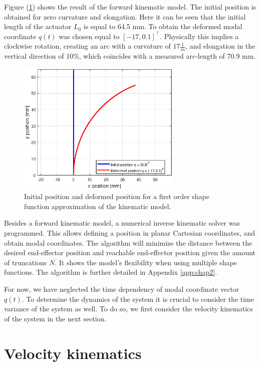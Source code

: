 Figure (\ref{fig1:forward_kinematic}) shows the result of the forward kinematic model. The initial position is obtained for zero curvature and elongation. Here it can be seen that the initial length of the actuator $L_0$ is equal to 64.5 mm. To obtain the deformed modal coordinate $q(t)$ was chosen equal to $[-17,0.1]^\top$. Physically this implies a clockwise rotation, creating an arc with a curvature of $17 \frac{1}{m}$, and elongation in the vertical direction of 10\%, which coincides with a measured arc-length of 70.9 mm.


\begin{figure}[H]
    \centering
    \includegraphics[width = 0.7\textwidth]{Figures/Chapter2/fkin1701.eps}
    \caption{Initial position and deformed position for a first order shape function approximation of the kinematic model.}
    \label{fig1:forward_kinematic}
\end{figure}

Besides a forward kinematic model, a numerical inverse kinematic solver was programmed. This allows defining a position in planar Cartesian coordinates, and obtain modal coordinates. The algorithm will minimize the distance between the desired end-effector position and reachable end-effector position given the amount of truncations $N$. It shows the model's flexibility when using multiple shape functions. The algorithm is further detailed in Appendix \ref{app:chap2}. 

For now, we have neglected the time dependency of modal coordinate vector $q(t)$. To determine the dynamics of the system it is crucial to consider the time variance of the system as well. To do so, we first consider the velocity kinematics of the system in the next section.


\section{Velocity kinematics}


